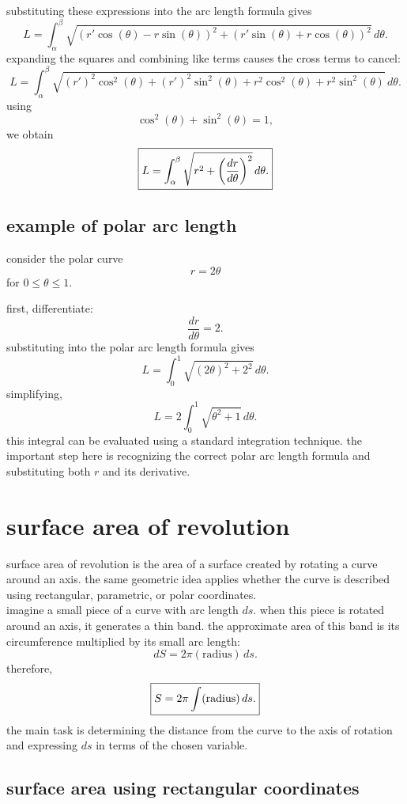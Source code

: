 \documentclass{article}
\newcommand{\mybox}[1]{\fbox{\ensuremath{\displaystyle #1}}}
\begin{document}
substituting these expressions into the arc length formula gives
\[
L=
\int_\alpha^\beta
\sqrt{
(r'\cos(\theta)-r\sin(\theta))^2
+
(r'\sin(\theta)+r\cos(\theta))^2
}\,d\theta.
\]
expanding the squares and combining like terms causes the cross terms to cancel:
\[
L=
\int_\alpha^\beta
\sqrt{
(r')^2\cos^2(\theta)
+(r')^2\sin^2(\theta)
+r^2\cos^2(\theta)
+r^2\sin^2(\theta)
}\,d\theta.
\]
using
\[
\cos^2(\theta)+\sin^2(\theta)=1,
\]
we obtain
\[
\mybox{
L=
\int_\alpha^\beta
\sqrt{
r^2+\left(\frac{dr}{d\theta}\right)^2
}\,d\theta.
}
\]

\subsection{example of polar arc length}

consider the polar curve
\[
r=2\theta
\]
for $0\leq\theta\leq1$.

first, differentiate:
\[
\frac{dr}{d\theta}=2.
\]
substituting into the polar arc length formula gives
\[
L=\int_0^1\sqrt{(2\theta)^2+2^2}\,d\theta.
\]
simplifying,
\[
L=2\int_0^1\sqrt{\theta^2+1}\,d\theta.
\]
this integral can be evaluated using a standard integration technique. the important step here is recognizing the correct polar arc length formula and substituting both $r$ and its derivative.\\

\newpage

\section{surface area of revolution}

surface area of revolution is the area of a surface created by rotating a curve around an axis. the same geometric idea applies whether the curve is described using rectangular, parametric, or polar coordinates.\\

imagine a small piece of a curve with arc length $ds$. when this piece is rotated around an axis, it generates a thin band. the approximate area of this band is its circumference multiplied by its small arc length:
\[
dS=2\pi(\mathrm{radius})\,ds.
\]
therefore,
\[
\mybox{S=2\pi\int(\mathrm{radius})\,ds.}
\]
the main task is determining the distance from the curve to the axis of rotation and expressing $ds$ in terms of the chosen variable.\\

\subsection{surface area using rectangular coordinates}
\end{document}
